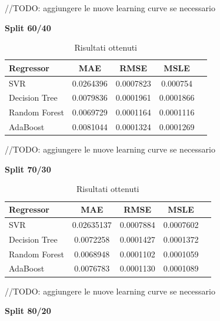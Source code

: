 //TODO: aggiungere le nuove learning curve se necessario

\textbf{Split 60/40}


\begin{table}[H]
    \centering
    \begin{tabular}{|>{\centering\arraybackslash}m{5cm}|c|c|c|c|}
        \hline
        \textbf{Regressor} & \textbf{MAE} & \textbf{RMSE} & \textbf{MSLE} \\ [10pt]
        \hline
        SVR & 0.0264396 & 0.0007823 & 0.000754 \\ [10pt]
        \hline
        Decision Tree & 0.0079836 & 0.0001961 & 0.0001866 \\ [10pt]
        \hline
        Random Forest & 0.0069729 & 0.0001164 & 0.0001116 \\ [10pt]
        \hline
        AdaBoost & 0.0081044 & 0.0001324 & 0.0001269 \\ [10pt]
        \hline
    \end{tabular}
    \caption*{Risultati ottenuti}
    \label{tab:results}
\end{table}

//TODO: aggiungere le nuove learning curve se necessario

\textbf{Split 70/30}


\begin{table}[H]
    \centering
    \begin{tabular}{|>{\centering\arraybackslash}m{5cm}|c|c|c|c|}
        \hline
        \textbf{Regressor} & \textbf{MAE} & \textbf{RMSE} & \textbf{MSLE} \\ [10pt]
        \hline
        SVR & 0.02635137 & 0.0007884 & 0.0007602 \\ [10pt]
        \hline
        Decision Tree & 0.0072258 & 0.0001427 & 0.0001372 \\ [10pt]
        \hline
        Random Forest & 0.0068948 & 0.0001102 & 0.0001059 \\ [10pt]
        \hline
        AdaBoost & 0.0076783 & 0.0001130 & 0.0001089 \\ [10pt]
        \hline
    \end{tabular}
    \caption*{Risultati ottenuti}
    \label{tab:results}
\end{table}

//TODO: aggiungere le nuove learning curve se necessario


\textbf{Split 80/20}


